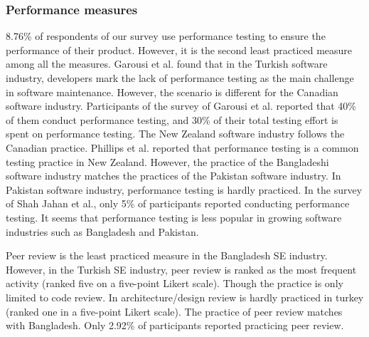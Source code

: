 \subsubsection{Performance measures}
\label{performance_comparison}
8.76\% of respondents of our survey use performance testing to ensure the performance of their product. However, it is the second least practiced measure among all the measures. Garousi et al.\cite{Garousi2015} found that in the Turkish software industry, developers mark the lack of performance testing as the main challenge in software maintenance. However, the scenario is different for the Canadian software industry. Participants of the survey of Garousi et al.\cite{Garousi2013} reported that 40\% of them conduct performance testing, and 30\% of their total testing effort is spent on performance testing. The New Zealand software industry follows the Canadian practice. Phillips et al.\cite{Phillips2003} reported that performance testing is a common testing practice in New Zealand. However, the practice of the Bangladeshi software industry matches the practices of the Pakistan software industry. In Pakistan software industry, performance testing is hardly practiced. In the survey of Shah Jahan et al.\cite{Jahan2019}, only 5\% of participants reported conducting performance testing. It seems that performance testing is less popular in growing software industries such as Bangladesh and Pakistan.

Peer review is the least practiced measure in the Bangladesh SE industry. However, in the Turkish SE industry, peer review is ranked as the most frequent activity\cite{Garousi2015} (ranked five on a five-point Likert scale). Though the practice is only limited to code review. In architecture/design review is  hardly practiced in turkey (ranked one in a five-point Likert scale). The practice of peer review matches with Bangladesh. Only 2.92\% of participants reported practicing peer review.

